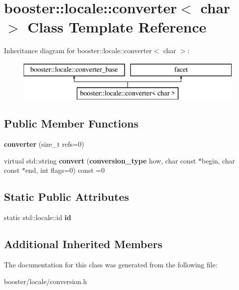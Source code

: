 \section{booster\-:\-:locale\-:\-:converter$<$ char $>$ Class Template Reference}
\label{classbooster_1_1locale_1_1converter_3_01char_01_4}
Inheritance diagram for booster\-:\-:locale\-:\-:converter$<$ char $>$\-:\begin{figure}[H]
\begin{center}
\leavevmode
\includegraphics[height=2.000000cm]{classbooster_1_1locale_1_1converter_3_01char_01_4}
\end{center}
\end{figure}
\subsection*{Public Member Functions}
\begin{DoxyCompactItemize}
\item 
{\bfseries converter} (size\-\_\-t refs=0)\label{classbooster_1_1locale_1_1converter_3_01char_01_4_a0fe9bcea296deda0ed9217b09de2a862}

\item 
virtual std\-::string {\bfseries convert} ({\bf conversion\-\_\-type} how, char const $\ast$begin, char const $\ast$end, int flags=0) const =0\label{classbooster_1_1locale_1_1converter_3_01char_01_4_a5ef2642c11c137cb9d93368ae76b5792}

\end{DoxyCompactItemize}
\subsection*{Static Public Attributes}
\begin{DoxyCompactItemize}
\item 
static std\-::locale\-::id {\bfseries id}\label{classbooster_1_1locale_1_1converter_3_01char_01_4_a5a14a4e6600b6eae8b7ff2ea01b16a94}

\end{DoxyCompactItemize}
\subsection*{Additional Inherited Members}


The documentation for this class was generated from the following file\-:\begin{DoxyCompactItemize}
\item 
booster/locale/conversion.\-h\end{DoxyCompactItemize}
